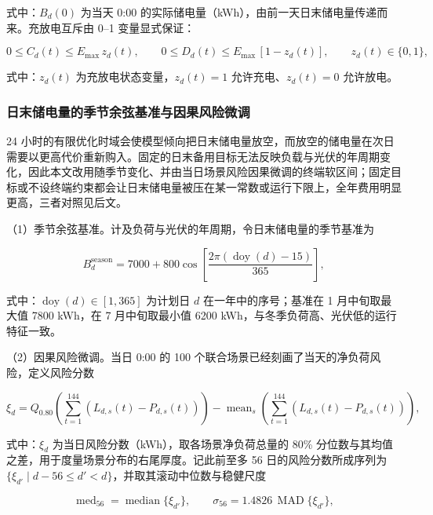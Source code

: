 式中：$B_d(0)$ 为当天 0:00 的实际储电量（kWh），由前一天日末储电量传递而来。充放电互斥由 0--1 变量显式保证：

\begin{equation}
  0 \le C_d(t) \le E_{\max}\,z_d(t), \qquad
  0 \le D_d(t) \le E_{\max}\,[1 - z_d(t)], \qquad
  z_d(t) \in \{0,1\},
  \label{eq:q2_mutex}
\end{equation}

式中：$z_d(t)$ 为充放电状态变量，$z_d(t)=1$ 允许充电、$z_d(t)=0$ 允许放电。

\subsubsection{日末储电量的季节余弦基准与因果风险微调}

24 小时的有限优化时域会使模型倾向把日末储电量放空，而放空的储电量在次日需要以更高代价重新购入。固定的日末备用目标无法反映负载与光伏的年周期变化，因此本文改用随季节变化、并由当日场景风险因果微调的终端软区间；固定目标或不设终端约束都会让日末储电量被压在某一常数或运行下限上，全年费用明显更高，三者对照见后文。

（1）季节余弦基准。计及负荷与光伏的年周期，令日末储电量的季节基准为

\begin{equation}
  B_d^{\mathrm{season}} = 7000 + 800\cos\!\left[\frac{2\pi\left(\operatorname{doy}(d) - 15\right)}{365}\right],
  \label{eq:q2_season}
\end{equation}

式中：$\operatorname{doy}(d)\in[1,365]$ 为计划日 $d$ 在一年中的序号；基准在 1 月中旬取最大值 7800 kWh，在 7 月中旬取最小值 6200 kWh，与冬季负荷高、光伏低的运行特征一致。

（2）因果风险微调。当日 0:00 的 100 个联合场景已经刻画了当天的净负荷风险，定义风险分数

\begin{equation}
  \xi_d = Q_{0.80}\!\left(\sum_{t=1}^{144}\left(L_{d,s}(t)-P_{d,s}(t)\right)\right)
  - \operatorname{mean}_s\!\left(\sum_{t=1}^{144}\left(L_{d,s}(t)-P_{d,s}(t)\right)\right),
  \label{eq:q2_riskscore}
\end{equation}

式中：$\xi_d$ 为当日风险分数（kWh），取各场景净负荷总量的 80\% 分位数与其均值之差，用于度量场景分布的右尾厚度。记此前至多 56 日的风险分数所成序列为 $\{\xi_{d'}\mid d-56\le d'<d\}$，并取其滚动中位数与稳健尺度

\begin{equation}
  \operatorname{med}_{56} = \operatorname{median}\{\xi_{d'}\}, \qquad
  \sigma_{56} = 1.4826\,\operatorname{MAD}\{\xi_{d'}\},
  \label{eq:q2_medmad}
\end{equation}

